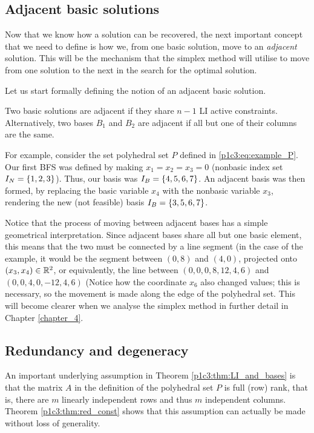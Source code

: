 \subsection{Adjacent basic solutions}

Now that we know how a solution can be recovered, the next important concept that we need to define is how we, from one basic solution, move to an \emph{adjacent} solution. This will be the mechanism that the simplex method will utilise to move from one solution to the next in the search for the optimal solution.

Let us start formally defining the notion of an adjacent basic solution.
%
\begin{definition}
	Two basic solutions are adjacent if they share $n-1$ LI active constraints. Alternatively, two bases $B_1$ and $B_2$ are adjacent if all but one of their columns are the same.
\end{definition}
%
For example, consider the set polyhedral set $P$ defined in \eqref{p1c3:eq:example_P}. Our first BFS was defined by making $x_1 = x_2 = x_3 = 0$ (nonbasic index set $I_N = \left\{ 1,2,3 \right \}$). Thus, our basis was $I_B = \left\{ 4,5,6,7 \right \}$. An adjacent basis was then formed, by replacing the basic variable $x_4$ with the nonbasic variable $x_3$, rendering the new (not feasible) basis $I_B = \left\{ 3,5,6,7 \right \}$.

Notice that the process of moving between adjacent bases has a simple geometrical interpretation. Since adjacent bases share all but one basic element, this means that the two must be connected by a line segment (in the case of the example, it would be the segment between $(0,8)$ and $(4,0)$, projected onto $(x_3,x_4) \in \mathbb{R}^2$, or equivalently, the line between $(0,0,0,8,12,4,6)$ and $(0,0,4,0,-12,4,6)$ (Notice how the coordinate $x_6$ also changed values; this is necessary, so the movement is made along the edge of the polyhedral set. This will become clearer when we analyse the simplex method in further detail in Chapter \ref{chapter_4}. 



\subsection{Redundancy and degeneracy}

An important underlying assumption in Theorem \ref{p1c3:thm:LI_and_bases} is that the matrix $A$ in the definition of the polyhedral set $P$ is full (row) rank, that is, there are $m$ linearly independent rows and thus $m$ independent columns. Theorem \ref{p1c3:thm:red_const} shows that this assumption can actually be made without loss of generality. 
 
